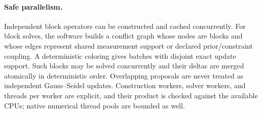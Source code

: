 \paragraph{Safe parallelism.}
Independent block operators can be constructed and cached concurrently.  For
block solves, the software builds a conflict graph whose nodes are blocks and
whose edges represent shared measurement support or declared prior/constraint
coupling.  A deterministic coloring gives batches with disjoint exact update
support.  Such blocks may be solved concurrently and their deltas are merged
atomically in deterministic order.  Overlapping proposals are never treated as
independent Gauss--Seidel updates.  Construction workers, solver workers, and
threads per worker are explicit, and their product is checked against the
available CPUs; native numerical thread pools are bounded as well.

